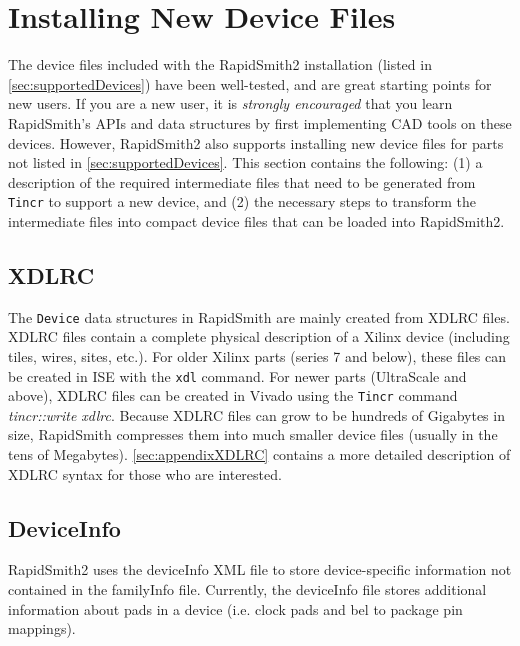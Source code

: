 \newpage
\section{Installing New Device Files} \label{sec:installingDeviceFiles}
The device files included with the RapidSmith2 installation (listed in
\autoref{sec:supportedDevices}) have been well-tested, and are great starting
points for new users. If you are a new user, it is \emph{strongly encouraged}
that you learn RapidSmith's APIs and data structures by first implementing CAD tools on
these devices. However, RapidSmith2 also supports installing new device files
for parts not listed in \autoref{sec:supportedDevices}. This section contains
the following: (1) a description of the required intermediate files that need to be
generated from \texttt{Tincr} to support a new device, and (2) the necessary
steps to transform the intermediate files into compact device files that can be
loaded into RapidSmith2.

\subsection {XDLRC}
The \texttt{Device} data structures in RapidSmith are mainly created from XDLRC
files. XDLRC files contain a complete physical description of a Xilinx device
(including tiles, wires, sites, etc.). For older Xilinx parts (series 7 and
below), these files can be created in ISE with the \texttt{xdl} command. For
newer parts (UltraScale and above), XDLRC files can be created in Vivado using
the \texttt{Tincr} command \textit{tincr::write xdlrc}. Because XDLRC files can
grow to be hundreds of Gigabytes in size, RapidSmith compresses them into much smaller device files
(usually in the tens of Megabytes). \autoref{sec:appendixXDLRC} contains a more
detailed description of XDLRC syntax for those who are interested.

\subsection{DeviceInfo}
RapidSmith2 uses the deviceInfo XML file to store
device-specific information not contained in the familyInfo file. Currently, the
deviceInfo file stores additional information about pads in a device (i.e. clock
pads and bel to package pin mappings).

